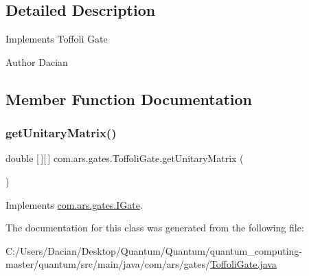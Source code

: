 \subsection{Detailed Description}
Implements Toffoli Gate \begin{DoxyAuthor}{Author}
Dacian 
\end{DoxyAuthor}


\subsection{Member Function Documentation}
\hypertarget{classcom_1_1ars_1_1gates_1_1_toffoli_gate_a0c253237312f11c98ffea807d63f925c}{}\label{classcom_1_1ars_1_1gates_1_1_toffoli_gate_a0c253237312f11c98ffea807d63f925c} 
\subsubsection{\texorpdfstring{get\+Unitary\+Matrix()}{getUnitaryMatrix()}}
{\footnotesize\ttfamily double \mbox{[}$\,$\mbox{]}\mbox{[}$\,$\mbox{]} com.\+ars.\+gates.\+Toffoli\+Gate.\+get\+Unitary\+Matrix (\begin{DoxyParamCaption}{ }\end{DoxyParamCaption})}



Implements \hyperlink{interfacecom_1_1ars_1_1gates_1_1_i_gate_a6a940b3a6940cd97429aa211143121cb}{com.\+ars.\+gates.\+I\+Gate}.



The documentation for this class was generated from the following file\+:\begin{DoxyCompactItemize}
\item 
C\+:/\+Users/\+Dacian/\+Desktop/\+Quantum/\+Quantum/quantum\+\_\+computing-\/master/quantum/src/main/java/com/ars/gates/\hyperlink{_toffoli_gate_8java}{Toffoli\+Gate.\+java}\end{DoxyCompactItemize}
